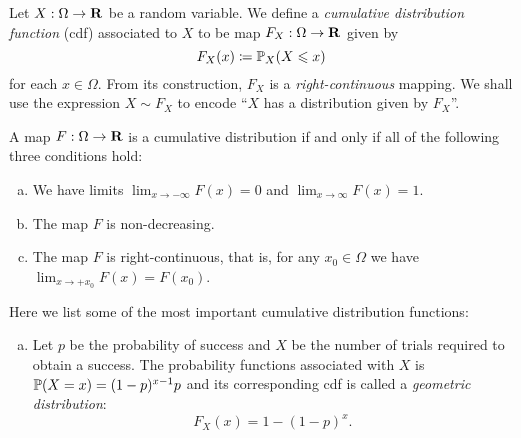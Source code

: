 \begin{definition}
    \label{def:cumulative-distribution-function}
    Let \(X: \Omega \to \mathbf{R}\) be a random variable. We define a \emph{cumulative distribution
        function} (cdf) associated to \(X\) to be map \(F_X: \Omega \to \mathbf{R}\) given by
    \[
        F_X(x) \coloneq \operatorname{\mathbb{P}}_X(X \leqslant x)
    \]
    for each \(x \in \Omega\). From its construction, \(F_X\) is a
    \emph{right-continuous} mapping. We shall use the expression \(X \sim F_X\) to
    encode ``\(X\) has a distribution given by \(F_X\)''.
\end{definition}

\begin{theorem}
    \label{thm:cdf-iff-properties}
    A map \(F: \Omega \to \mathbf{R}\) is a cumulative distribution if and only if all of
    the following three conditions hold:
    \begin{enumerate}[(a)]\setlength\itemsep{0em}
        \item We have limits \(\lim_{x \to -\infty} F(x) = 0\) and \(\lim_{x \to \infty} F(x) = 1\).
        \item The map \(F\) is non-decreasing.
        \item The map \(F\) is right-continuous, that is, for any \(x_0 \in \Omega\) we
              have \(\lim_{x \to +x_0} F(x) = F(x_0)\).
    \end{enumerate}
\end{theorem}

\begin{example}
    \label{exp:cdfs}
    Here we list some of the most important cumulative distribution functions:
    \begin{enumerate}[(a)]\setlength\itemsep{0em}
        \item Let \(p\) be the probability of success and \(X\) be the number of trials
              required to obtain a success. The probability functions associated with \(X\)
              is \(\operatorname{\mathbb{P}}(X = x) = (1 - p)^{x-1} p\) and its corresponding cdf is called a
              \emph{geometric distribution}:
              \[
                  F_X(x) = 1 - (1 - p)^x.
              \]

    \end{enumerate}
\end{example}

